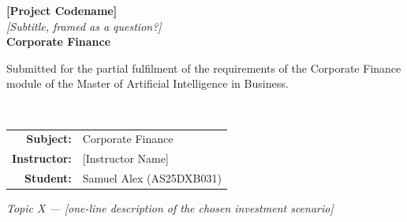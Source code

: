 \documentclass[12pt]{article}
\begin{document}
\begin{center}
\vspace*{3.2cm}

{\Huge \textbf{[Project Codename]}}\\[0.5cm]
{\Large \textit{[Subtitle, framed as a question?]}}\\[2.2cm]

{\large \textbf{Corporate Finance}}\\[0.5cm]
\parbox{11cm}{\centering Submitted for the partial fulfilment of the requirements of the Corporate Finance module of the Master of Artificial Intelligence in Business.}\\[2.5cm]

\renewcommand{\arraystretch}{1.6}
\begin{tabular}{rl}
\textbf{Subject:} & Corporate Finance \\
\textbf{Instructor:} & [Instructor Name] \\
\textbf{Student:} & Samuel Alex (AS25DXB031) \\
\end{tabular}

\vfill

\textit{Topic X --- [one-line description of the chosen investment scenario]}

\vspace*{1.6cm}
\end{center}
\end{document}
